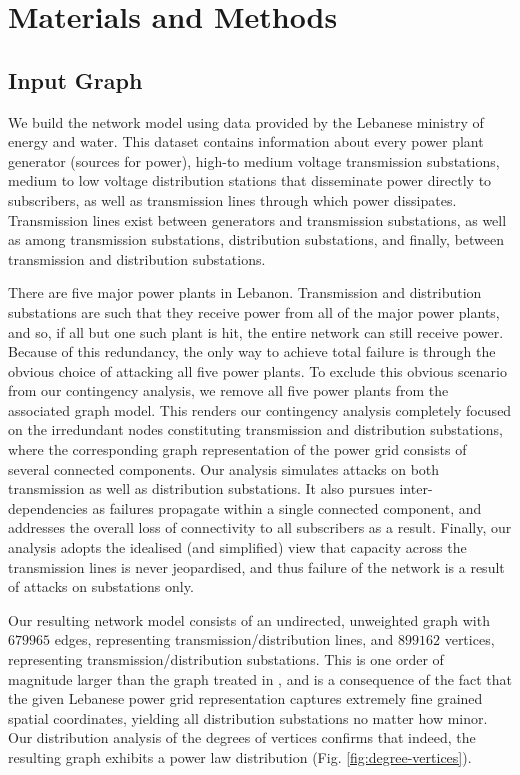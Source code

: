 
\section{Materials and Methods}
\label{methods}

\subsection{Input Graph}

We build the network model using data provided by the Lebanese ministry of energy and water. This dataset contains information about every power plant generator (sources for power), high-to medium voltage transmission substations, medium to low voltage distribution stations that disseminate power directly to subscribers, as well as transmission lines through which power dissipates. Transmission lines exist between generators and transmission substations, as well as among transmission substations, distribution substations, and finally, between transmission and distribution substations. 

There are five major power plants in Lebanon. Transmission and distribution substations are such that they receive power from all of the major power plants, and so, if all but one such plant is hit, the entire network can still receive power. Because of this redundancy, the only way to achieve total failure is through the obvious choice of attacking all five power plants. To exclude this obvious scenario from our contingency analysis, we remove all five power plants from the associated graph model. This renders our contingency analysis completely focused on the irredundant nodes constituting transmission and distribution substations, where the corresponding graph representation of the power grid consists of several connected components. Our analysis simulates attacks on both transmission as well as distribution substations. It also pursues inter-dependencies as failures propagate within a single connected component, and addresses the overall loss of connectivity to all subscribers as a result. Finally, our analysis adopts the idealised (and simplified) view that capacity across the transmission lines is never jeopardised, and thus failure of the network is a result of attacks on substations only.

Our resulting network model consists of an undirected, unweighted graph with $679965$ edges, representing transmission/distribution lines, and $899162$ vertices, representing transmission/distribution substations. This is one order of magnitude larger than the graph treated in \cite{2000Natur.406..378A}, and is a consequence of the fact that the given Lebanese power grid representation captures extremely fine grained spatial coordinates, yielding all distribution substations no matter how minor. Our distribution analysis of the degrees of vertices confirms that indeed, the resulting graph exhibits a power law distribution (Fig. \ref{fig:degree-vertices}). 

